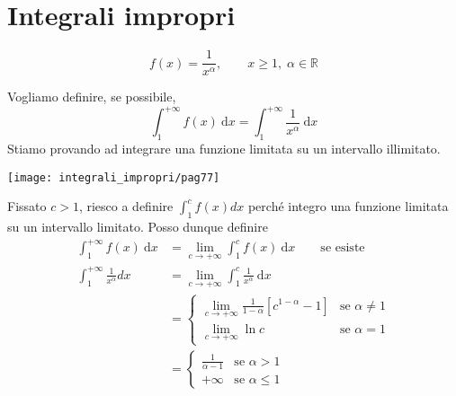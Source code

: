 \section{Integrali impropri}
\begin{exbar}
\begin{example}
	\begin{equation*}
		f(x)=\frac{1}{x^\alpha}, \qquad x \geq 1, \; \alpha \in \mathbb{R}
	\end{equation*}
	
	Vogliamo definire, se possibile, 
	\begin{equation*}
		\int_{1}^{+\infty} f(x) \ \mathrm{d}x= \int_{1}^{+\infty}\frac{1}{x^\alpha} \ \mathrm{d}x
	\end{equation*}
	Stiamo provando ad integrare una funzione limitata su un intervallo illimitato.
	\begin{center}
		\texttt{[image: integrali\_impropri/pag77]}
		\label{fig:pag77}
	\end{center}

	Fissato $c > 1$, riesco a definire $\int_{1}^{c} f(x)dx$ perché integro una funzione limitata su un intervallo limitato. Posso dunque definire
	\begin{align*}
		\int_{1}^{+\infty} f(x) \ \mathrm{d}x 
		&= \lim_{c\rightarrow +\infty} \int_{1}^{c}f(x) \ \mathrm{d}x \qquad \text{se esiste}
		\\
		\int_{1}^{+\infty} \frac{1}{x^\alpha} dx 
		&= \lim_{c \rightarrow + \infty} \int_{1}^{c} \frac{1}{x^\alpha} \ \mathrm{d} x 
		\\
		&=
		\begin{cases}
			\lim_{c \rightarrow +\infty}\frac{1}{1-\alpha}[c^{1-\alpha}-1] & \text{se } \alpha \neq 1
			\\[1em]
			\lim_{c \rightarrow +\infty} \ln c & \text{se } \alpha=1
		\end{cases}
		\\
		&=
		\begin{cases}
			 \frac{1}{\alpha-1} & \text{se } \alpha > 1
			\\[1em]
			+\infty & \text{se } \alpha \leq 1
		\end{cases}
	\end{align*}
\end{example}
\end{exbar}

